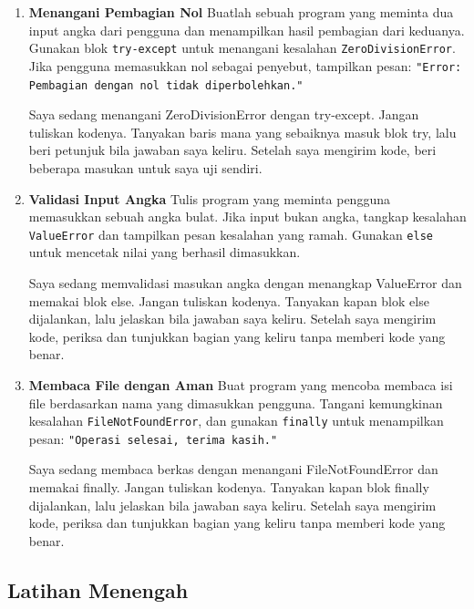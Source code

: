 \begin{enumerate}
    \item \textbf{Menangani Pembagian Nol}  
    Buatlah sebuah program yang meminta dua input angka dari pengguna dan menampilkan hasil pembagian dari keduanya.  
    Gunakan blok \texttt{try-except} untuk menangani kesalahan \texttt{ZeroDivisionError}.  
    Jika pengguna memasukkan nol sebagai penyebut, tampilkan pesan:  
    \texttt{"Error: Pembagian dengan nol tidak diperbolehkan."}

      \begin{promptterarah}
      Saya sedang menangani ZeroDivisionError dengan try-except. Jangan tuliskan kodenya. Tanyakan baris mana yang sebaiknya masuk blok try, lalu beri petunjuk bila jawaban saya keliru. Setelah saya mengirim kode, beri beberapa masukan untuk saya uji sendiri.
      \end{promptterarah}
    \item \textbf{Validasi Input Angka}  
    Tulis program yang meminta pengguna memasukkan sebuah angka bulat.  
    Jika input bukan angka, tangkap kesalahan \texttt{ValueError} dan tampilkan pesan kesalahan yang ramah.  
    Gunakan \texttt{else} untuk mencetak nilai yang berhasil dimasukkan.

      \begin{promptterarah}
      Saya sedang memvalidasi masukan angka dengan menangkap ValueError dan memakai blok else. Jangan tuliskan kodenya. Tanyakan kapan blok else dijalankan, lalu jelaskan bila jawaban saya keliru. Setelah saya mengirim kode, periksa dan tunjukkan bagian yang keliru tanpa memberi kode yang benar.
      \end{promptterarah}
    \item \textbf{Membaca File dengan Aman}  
    Buat program yang mencoba membaca isi file berdasarkan nama yang dimasukkan pengguna.  
    Tangani kemungkinan kesalahan \texttt{FileNotFoundError}, dan gunakan \texttt{finally} untuk menampilkan pesan:  
    \texttt{"Operasi selesai, terima kasih."}
  \begin{promptterarah}
  Saya sedang membaca berkas dengan menangani FileNotFoundError dan memakai finally. Jangan tuliskan kodenya. Tanyakan kapan blok finally dijalankan, lalu jelaskan bila jawaban saya keliru. Setelah saya mengirim kode, periksa dan tunjukkan bagian yang keliru tanpa memberi kode yang benar.
  \end{promptterarah}
\end{enumerate}

\subsection*{Latihan Menengah}


